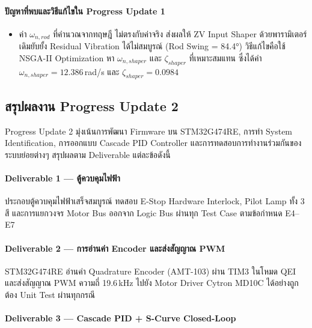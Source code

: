 \paragraph{ปัญหาที่พบและวิธีแก้ไขใน Progress Update 1}

\begin{itemize}
  \item ค่า $\omega_{n,rod}$ ที่คำนวณจากทฤษฎี
        ไม่ตรงกับค่าจริง ส่งผลให้ ZV Input Shaper
        ด้วยพารามิเตอร์เดิมยับยั้ง Residual Vibration
        ได้ไม่สมบูรณ์ (Rod Swing = 84.4°)
        วิธีแก้ไขคือใช้ NSGA-II Optimization
        หา $\omega_{n,shaper}$ และ $\zeta_{shaper}$
        ที่เหมาะสมแทน ซึ่งได้ค่า
        $\omega_{n,shaper} = 12.386$\,rad/s
        และ $\zeta_{shaper} = 0.0984$
\end{itemize}

\subsection{สรุปผลงาน Progress Update 2}
\label{subsec:progress_update_2}

Progress Update 2 มุ่งเน้นการพัฒนา Firmware
บน STM32G474RE, การทำ System Identification,
การออกแบบ Cascade PID Controller
และการทดสอบการทำงานร่วมกันของระบบย่อยต่างๆ
สรุปผลตาม Deliverable แต่ละข้อดังนี้

\paragraph{Deliverable 1 --- ตู้ควบคุมไฟฟ้า}

ประกอบตู้ควบคุมไฟฟ้าเสร็จสมบูรณ์
ทดสอบ E-Stop Hardware Interlock,
Pilot Lamp ทั้ง 3 สี และการแยกวงจร
Motor Bus ออกจาก Logic Bus ผ่านทุก Test Case
ตามข้อกำหนด E4--E7

\paragraph{Deliverable 2 --- การอ่านค่า Encoder และส่งสัญญาณ PWM}

STM32G474RE อ่านค่า Quadrature Encoder
(AMT-103) ผ่าน TIM3 ในโหมด QEI
และส่งสัญญาณ PWM ความถี่ 19.6\,kHz
ไปยัง Motor Driver Cytron MD10C
ได้อย่างถูกต้อง Unit Test ผ่านทุกกรณี

\paragraph{Deliverable 3 --- Cascade PID + S-Curve Closed-Loop}

